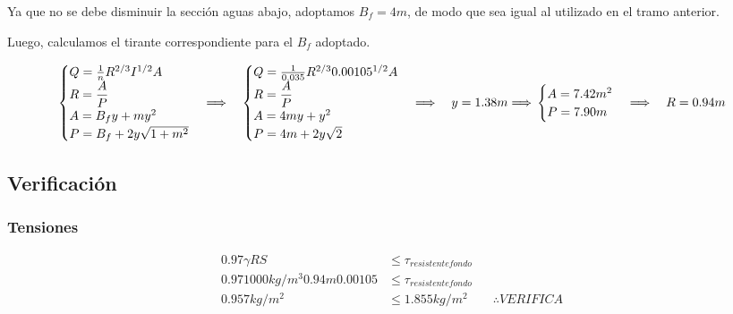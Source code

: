 \documentclass[10.5pt]{article}
\begin{document}
Ya que no se debe disminuir la sección aguas abajo, adoptamos $B_{f} = 4 m$, de modo que sea igual al utilizado en el tramo anterior.

Luego, calculamos el tirante correspondiente para el $B_{f}$ adoptado.

\begin{equation*}
  \begin{cases}
    Q = \frac{1}{n} R^{2/3} I^{1/2} A \\
    R = \dfrac{A}{P} \\
    A = B_{f}y + m y^{2} \\
    P = B_{f} + 2 y \sqrt{1 + m^{2}}
  \end{cases}
  \Longrightarrow \quad
  \begin{cases}
    Q = \frac{1}{0.035} R^{2/3} 0.00105^{1/2} A \\
    R = \dfrac{A}{P} \\
    A = 4 m y + y^2 \\
    P = 4 m + 2 y \sqrt{2}
  \end{cases}
  \Longrightarrow \quad
  y = 1.38 m
  \Longrightarrow \newline
  \begin{cases}
    A = 7.42 m^2 \\
    P = 7.90 m
  \end{cases}
  \Longrightarrow \quad
  R = 0.94 m
\end{equation*}


\subsection*{Verificación}

\subsubsection*{Tensiones}

\begin{align*}
 0.97 \gamma R S &\leq \tau_{resistente fondo} \\
 0.97 1000 kg/m^3 0.94 m 0.00105 &\leq \tau_{resistente fondo} \\
 0.957 kg/m^2 &\leq 1.855 kg/m^2
 \qquad
 \therefore VERIFICA 
\end{align*}
\end{document}

